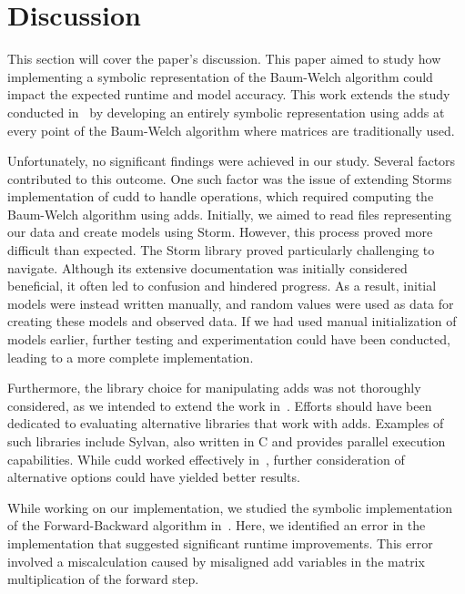

\section{Discussion}\label{sec:discussion}
This section will cover the paper's discussion. 
This paper aimed to study how implementing a symbolic representation of the Baum-Welch algorithm could impact the expected runtime and model accuracy. 
This work extends the study conducted in~\cite{p7} by developing an entirely symbolic representation using \glspl{add} at every point of the Baum-Welch algorithm where matrices are traditionally used.

Unfortunately, no significant findings were achieved in our study. Several factors contributed to this outcome. 
One such factor was the issue of extending Storms implementation of \gls{cudd} to handle operations, which required computing the Baum-Welch algorithm using \glspl{add}. 
Initially, we aimed to read files representing our data and create models using Storm. 
However, this process proved more difficult than expected. 
The Storm library proved particularly challenging to navigate. 
Although its extensive documentation was initially considered beneficial, it often led to confusion and hindered progress. 
As a result, initial models were instead written manually, and random values were used as data for creating these models and observed data. 
If we had used manual initialization of models earlier, further testing and experimentation could have been conducted, leading to a more complete implementation.

Furthermore, the library choice for manipulating \glspl{add} was not thoroughly considered, as we intended to extend the work in~\cite{p7}.
Efforts should have been dedicated to evaluating alternative libraries that work with \glspl{add}. 
Examples of such libraries include Sylvan, also written in C and provides parallel execution capabilities. 
While \gls{cudd} worked effectively in~\cite{p7}, further consideration of alternative options could have yielded better results.

While working on our implementation, we studied the symbolic implementation of the Forward-Backward algorithm in~\cite{p7}. 
Here, we identified an error in the implementation that suggested significant runtime improvements. 
This error involved a miscalculation caused by misaligned \gls{add} variables in the matrix multiplication of the forward step.

